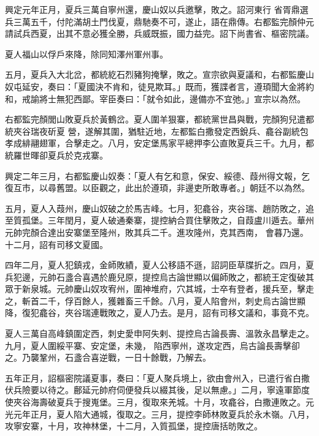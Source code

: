 \begin{pinyinscope}
 興定元年正月，夏兵三萬自寧州還，慶山奴以兵邀擊，敗之。詔河東行
 省胥鼎選兵三萬五千，付陀滿胡土門伐夏，鼎馳奏不可，遂止，語在鼎傳。右都監完顏仲元請試兵西夏，出其不意必獲全勝，兵威既振，國力益完。詔下尚書省、樞密院議。



 夏人福山以俘戶來降，除同知澤州軍州事。



 五月，夏兵入大北岔，都統紇石烈豬狗掩擊，敗之。宣宗欲與夏議和，右都監慶山奴屯延安，奏曰：「夏國決不肯和，徒見欺耳。」既而，獲諜者言，遵頊聞大金將約和，戒諭將士無犯西鄙。宰臣奏曰：「就令如此，邊備亦不宜弛。」宣宗以為然。



 右都監完顏閭山敗夏兵於黃鶴岔。夏人圍羊狠寨，都統黨世昌與戰，完顏狗兒遣都統夾谷瑞夜斫夏
 營，遂解其圍，猶駐近地，左都監白撒發定西銳兵、龕谷副統包孝成緋翮翅軍，合擊走之。八月，安定堡馬家平總押李公直敗夏兵三千。九月，都統羅世暉卻夏兵於克戎寨。



 興定二年三月，右都監慶山奴奏：「夏人有乞和意，保安、綏德、葭州得文報，乞復互市，以尋舊盟。以臣觀之，此出於遵頊，非邊吏所敢專者。」朝廷不以為然。



 五月，夏人入葭州，慶山奴破之於馬吉峰。七月，犯龕谷，夾谷瑞、趙防敗之，追至質孤堡。三年閏月，夏人破通秦寨，提控納合買住擊敗之，自葭盧川遁去。華州元帥完顏合達出安寨堡至隆州，敗其兵二千。進攻隆州，克其西南，
 會暮乃還。十二月，詔有司移文夏國。



 四年二月，夏人犯鎮戎，金師敗績，夏人公移語不遜，詔詞臣草牒折之。四月，夏兵犯邊，元帥石盞合喜遇於鹿兒原，提控烏古論世顯以偏師敗之，都統王定復破其眾于新泉城。元帥慶山奴攻宥州，圍神堆府，穴其城，士卒有登者，援兵至，擊走之，斬首二千，俘百餘人，獲雜畜三千餘。八月，夏人陷會州，刺史烏古論世顯降，復犯龕谷，夾谷瑞連戰敗之，夏人乃去。是月，詔有司移文議和，事竟不克。



 夏人三萬自高峰鎮圍定西，刺史愛申阿失剌、提控烏古論長壽、溫敦永昌擊走之。九月，夏人圍綏平寨、安定堡，未幾，
 陷西寧州，遂攻定西，烏古論長壽擊卻之。乃襲鞏州，石盞合喜逆戰，一日十餘戰，乃解去。



 五年正月，詔樞密院議夏事，奏曰：「夏人聚兵境上，欲由會州入，已遣行省白撒伏兵險要以待之。鄜延元帥府伺便發兵以綴其後，足以無慮。」二月，寧遠軍節度使夾谷海壽破夏兵于搜嵬堡。三月，復取來羌城。十月，攻龕谷，白撒連敗之。元光元年正月，夏人陷大通城，復取之。三月，提控李師林敗夏兵於永木嶺。八月，攻寧安寨，十月，攻神林堡，十二月，入質孤堡，提控唐括昉敗之。




\end{pinyinscope}
